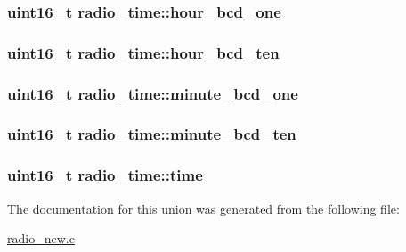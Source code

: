 \subsubsection[{hour\+\_\+bcd\+\_\+one}]{\setlength{\rightskip}{0pt plus 5cm}uint16\+\_\+t radio\+\_\+time\+::hour\+\_\+bcd\+\_\+one}\label{unionradio__time_a3fd6ebeb948fd8fbef351e02d5a86d63}
\hypertarget{unionradio__time_a173314f920dc7461b836e23a4c4ca08c}{}
\subsubsection[{hour\+\_\+bcd\+\_\+ten}]{\setlength{\rightskip}{0pt plus 5cm}uint16\+\_\+t radio\+\_\+time\+::hour\+\_\+bcd\+\_\+ten}\label{unionradio__time_a173314f920dc7461b836e23a4c4ca08c}
\hypertarget{unionradio__time_aade9aa30034abe099a0e8d0d9813d2ac}{}
\subsubsection[{minute\+\_\+bcd\+\_\+one}]{\setlength{\rightskip}{0pt plus 5cm}uint16\+\_\+t radio\+\_\+time\+::minute\+\_\+bcd\+\_\+one}\label{unionradio__time_aade9aa30034abe099a0e8d0d9813d2ac}
\hypertarget{unionradio__time_aca5d8063e116f489ae3b1fb0637c44de}{}
\subsubsection[{minute\+\_\+bcd\+\_\+ten}]{\setlength{\rightskip}{0pt plus 5cm}uint16\+\_\+t radio\+\_\+time\+::minute\+\_\+bcd\+\_\+ten}\label{unionradio__time_aca5d8063e116f489ae3b1fb0637c44de}
\hypertarget{unionradio__time_a93c85fe59e0b9ea2664f2e0a25e3b515}{}
\subsubsection[{time}]{\setlength{\rightskip}{0pt plus 5cm}uint16\+\_\+t radio\+\_\+time\+::time}\label{unionradio__time_a93c85fe59e0b9ea2664f2e0a25e3b515}


The documentation for this union was generated from the following file\+:\begin{DoxyCompactItemize}
\item 
\hyperlink{radio__new_8c}{radio\+\_\+new.\+c}\end{DoxyCompactItemize}
